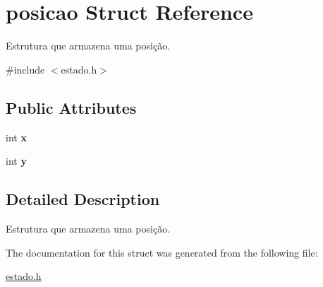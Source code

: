 \hypertarget{structposicao}{\section{posicao Struct Reference}
\label{structposicao}
}


Estrutura que armazena uma posição.  




{\ttfamily \#include $<$estado.\+h$>$}

\subsection*{Public Attributes}
\begin{DoxyCompactItemize}
\item 
\hypertarget{structposicao_a1eb052712bec40500df44ab9df72fb46}{int {\bfseries x}}\label{structposicao_a1eb052712bec40500df44ab9df72fb46}

\item 
\hypertarget{structposicao_a320c585fc5fc89e24a219513f27c680b}{int {\bfseries y}}\label{structposicao_a320c585fc5fc89e24a219513f27c680b}

\end{DoxyCompactItemize}


\subsection{Detailed Description}
Estrutura que armazena uma posição. 

The documentation for this struct was generated from the following file\+:\begin{DoxyCompactItemize}
\item 
\hyperlink{estado_8h}{estado.\+h}\end{DoxyCompactItemize}
